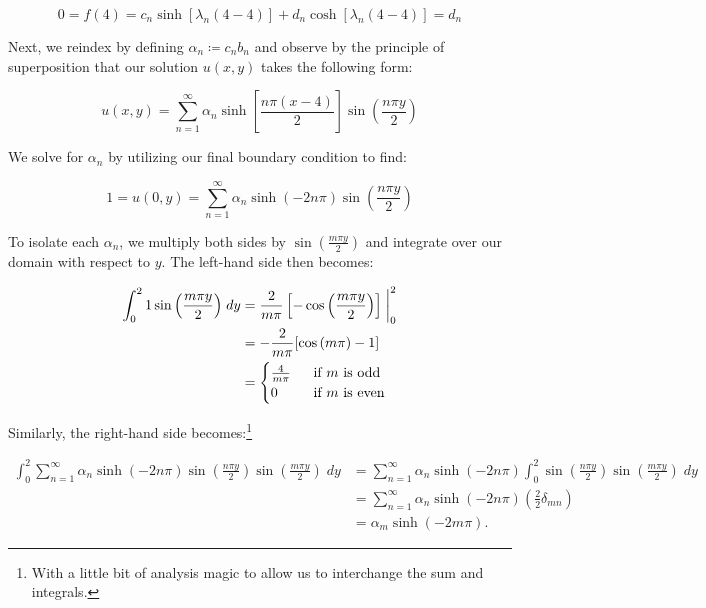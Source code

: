 \begin{solution}
  $$
    0 = f(4) = c_n \sinh{[\lambda_n (4-4)]} + d_n \cosh{[\lambda_n (4-4)]} = d_n
  $$

  Next, we reindex by defining $\alpha_n \coloneqq c_n b_n$ and observe by the principle of superposition that our
  solution $u(x, y)$ takes the following form:

  $$
  u(x, y) = \sum\limits_{n=1}^{\infty} \alpha_n \sinh{\left[ \frac{n \pi (x - 4)}{2} \right]} \sin{\left(\frac{n \pi y}{2}\right)}
  $$

  We solve for $\alpha_n$ by utilizing our final boundary condition to find:

  $$
  1 = u(0, y) = \sum\limits_{n=1}^{\infty} \alpha_n \sinh{(-2n \pi)} \sin{\left(\frac{n \pi y}{2}\right)}
  $$

  To isolate each $\alpha_n$, we multiply both sides by $\sin{\left(\frac{m \pi y}{2}\right)}$ and integrate over our
  domain with respect to $y$. The left-hand side then becomes:

  \begin{align*}
    \int_{0}^{2}{1 \sin{\left(\frac{m \pi y}{2} \right)}} \; dy &= \frac{2}{m \pi} \left[-\cos{\left( \frac{m \pi y}{2} \right)}\right] \biggm\rvert_{0}^{2} \\
                                                               &= -\frac{2}{m \pi} [\cos{(m \pi) - 1}] \\
                                                               &= \begin{cases}
                                                                 \frac{4}{m \pi} &\; \text{ if } m \text{ is odd} \\
                                                                 0               &\; \text{ if } m \text{ is even}
                                                              \end{cases}
  \end{align*}

  Similarly, the right-hand side becomes:\footnote{
    With a little bit of analysis magic to allow us to interchange the sum and integrals.
  }

  \begin{align*}
    \int_{0}^{2}{\sum\limits_{n=1}^{\infty} \alpha_n \sinh{(-2n \pi)} \sin{\left(\frac{n \pi y}{2}\right)} \sin{\left(\frac{m \pi y}{2}\right)}} \; dy &= 
    \sum\limits_{n=1}^{\infty} \alpha_n \sinh{(-2n \pi)} \int_{0}^{2}{\sin{\left(\frac{n \pi y}{2}\right)} \sin{\left(\frac{m \pi y}{2}\right)}} \; dy  \\
    &= \sum\limits_{n=1}^{\infty} \alpha_n \sinh{(-2n \pi)} \left(\frac{2}{2} \delta_{mn} \right) \\
    &= \alpha_m \sinh{(-2m \pi)}.
  \end{align*}


\end{solution}
